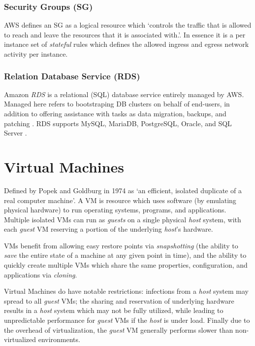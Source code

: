 \subsubsection{Security Groups (SG)}
AWS defines an SG as a logical resource which `controls the traffic that is allowed to reach and leave the resources that it is associated with.'\cite{amazon_2016}.
In essence it is a per instance set of \emph{stateful} rules which defines the allowed ingress and egress network activity per instance. 

\subsubsection{Relation Database Service (RDS)}
Amazon \emph{RDS} is a relational (SQL) database service entirely managed by AWS. Managed here refers to bootstraping DB clusters on behalf of end-users, in addition 
to offering assistance with tasks as data migration, backups, and patching \cite{lutkevich_2021}.
RDS supports MySQL, MariaDB, PostgreSQL, Oracle, and SQL Server \cite{beach2019relational}.

\section{Virtual Machines}
Defined by Popek and Goldburg in 1974 as `an efficient, isolated duplicate of a real computer machine'\cite{popek_1974}. 
A VM is resource which uses software (by emulating physical hardware) to run operating systems, programs, and applications. 
Multiple isolated VMs can run as \textit{guests} on a single physical \textit{host} system, with each \textit{guest} VM reserving a portion of the underlying
\textit{host}'s hardware. 

VMs benefit from allowing easy restore points via \textit{snapshotting} (the ability to \textit{save} the entire state of a machine at any given point in time), 
and the ability to quickly create multiple VMs which share the same properties, configuration, and applications via \textit{cloning}\cite{n-able_2021}. 

Virtual Machines do have notable restrictions: infections from a \textit{host} system may spread to all \textit{guest} VMs;
the sharing and reservation of underlying hardware results in a \textit{host} system which may not be fully utilized, 
while leading to unpredictable performance for \textit{guest} VMs if the \textit{host} is under load. 
Finally due to the overhead of virtualization, the \textit{guest} VM generally performs slower than non-virtualized environments\cite{Martinovic}.


